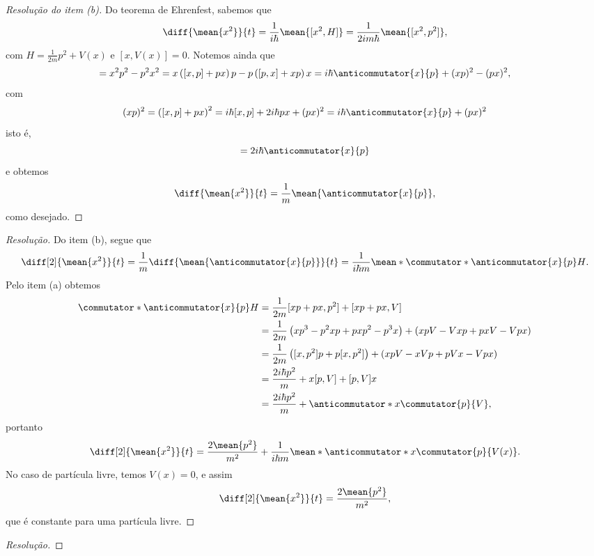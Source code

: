 \begin{proof}[Resolução do item (b)]
    Do teorema de Ehrenfest, sabemos que
    \begin{equation*}
        \diff{\mean{x^2}}{t} = \frac{1}{i\hbar} \mean{[x^2, H]} = \frac1{2i m \hbar}\mean{[x^2, p^2]},
    \end{equation*}
    com \(H = \frac{1}{2m}p^2 + V(x)\) e \([x, V(x)] = 0\). Notemos ainda que
    \begin{equation*}
        [x^2, p^2] = x^2 p^2 - p^2 x^2 = x \left([x,p] + px\right) p - p\left([p,x] + xp\right)x = i \hbar \anticommutator{x}{p} + (xp)^2 - (px)^2 ,
    \end{equation*}
    com
    \begin{equation*}
        (xp)^2 = \left([x,p] + px\right)^2 = i\hbar [x,p] +  2i\hbar px + (px)^2 = i \hbar \anticommutator{x}{p} + (px)^2
    \end{equation*}
    isto é,
    \begin{equation*}
        [x^2, p^2] = 2i\hbar \anticommutator{x}{p}
    \end{equation*}
    e obtemos
    \begin{equation*}
        \diff{\mean{x^2}}{t} = \frac{1}{m}\mean{\anticommutator{x}{p}},
    \end{equation*}
    como desejado.
\end{proof}
\begin{proof}[Resolução]
    Do item (b), segue que
    \begin{equation*}
        \diff[2]{\mean{x^2}}{t} = \frac{1}{m} \diff{\mean{\anticommutator{x}{p}}}{t} = \frac{1}{i \hbar m} \mean*{\commutator*{\anticommutator{x}{p}}{H}}. %
    \end{equation*}
    Pelo item (a) obtemos
    \begin{align*}
        \commutator*{\anticommutator{x}{p}}{H} &= \frac1{2m}[xp + px, p^2] + [xp + px, V]\\
                                               &= \frac{1}{2m}\left(xp^3 - p^2xp + pxp^2 - p^3x\right) + \left(xpV - Vxp + pxV - Vpx\right)\\
                                               &= \frac{1}{2m}\left([x,p^2]p + p[x,p^2]\right) + \left(xpV - xVp + pVx - Vp x\right)\\
                                               &= \frac{2 i\hbar p^2}{m} + x[p, V] + [p, V]x\\
                                               &= \frac{2i \hbar p^2}{m} + \anticommutator*{x}{\commutator{p}{V}},
    \end{align*}
    portanto
    \begin{equation*}
        \diff[2]{\mean{x^2}}{t} = \frac{2\mean{p^2}}{m^2} + \frac{1}{i\hbar m} \mean*{\anticommutator*{x}{\commutator{p}{V(x)}}}.
    \end{equation*}
    No caso de partícula livre, temos \(V(x) = 0\), e assim
    \begin{equation*}
        \diff[2]{\mean{x^2}}{t} = \frac{2\mean{p^2}}{m^2},
    \end{equation*}
    que é constante para uma partícula livre.
\end{proof}
\begin{proof}[Resolução]

\end{proof}
